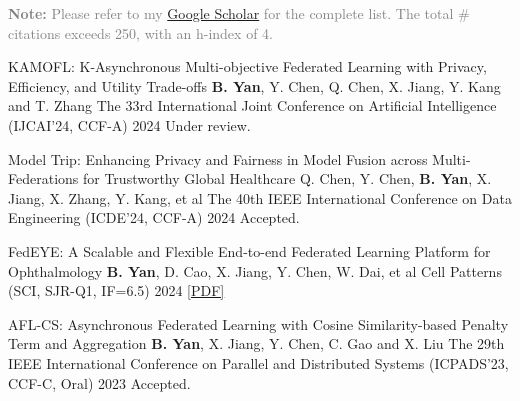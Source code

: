 
\begin{cvparagraph}
\textcolor{gray}{\textbf{Note:} Please refer to my \href{https://scholar.google.com/citations?hl=en&user=DVsgN1sAAAAJ}{Google Scholar} for the complete list.
The total \# citations exceeds 250, with an h-index of 4.}
\end{cvparagraph}

\begin{cvpublications}

\cvpublication
{KAMOFL: K-Asynchronous Multi-objective Federated Learning with Privacy, Efficiency, and Utility Trade-offs} %
{\textbf{B. Yan}, Y. Chen, Q. Chen, X. Jiang, Y. Kang and T. Zhang} %
{The 33rd International Joint Conference on Artificial Intelligence (IJCAI'24, CCF-A)} %
{2024} %
{Under review.} %


\cvpublication
{Model Trip: Enhancing Privacy and Fairness in Model Fusion across Multi-Federations for Trustworthy Global Healthcare} %
{Q. Chen, Y. Chen, \textbf{B. Yan}, X. Jiang, X. Zhang, Y. Kang, et al} %
{The 40th IEEE International Conference on Data Engineering (ICDE'24, CCF-A)} %
{2024} %
{Accepted.} %


\cvpublication
{FedEYE: A Scalable and Flexible End-to-end Federated Learning Platform for Ophthalmology} %
{\textbf{B. Yan}, D. Cao, X. Jiang, Y. Chen, W. Dai, et al} %
{Cell Patterns (SCI, SJR-Q1, IF=6.5)} %
{2024} %
{\href{https://www.cell.com/patterns/fulltext/S2666-3899(24)00019-9}{[PDF]}} %


\cvpublication
{AFL-CS: Asynchronous Federated Learning with Cosine Similarity-based Penalty Term and Aggregation} %
{\textbf{B. Yan}, X. Jiang, Y. Chen, C. Gao and X. Liu} %
{The 29th IEEE International Conference on Parallel and Distributed Systems (ICPADS'23, CCF-C, Oral)} %
{2023} %
{Accepted.} %


\end{cvpublications}
